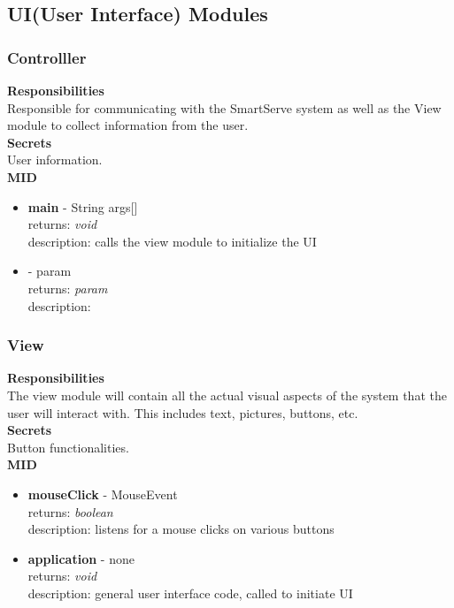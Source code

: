 \documentclass[11pt]{article}
\begin{document}
\subsection{UI(User Interface) Modules}
\subsubsection*{Controlller}
\textbf{Responsibilities} \\
Responsible for communicating with the SmartServe system as well as the View module to collect information from the user. \\
\textbf{Secrets} \\ 
User information. \\ 
\textbf{MID} \\
\begin{itemize}
\item \textbf{main} - String args[] \\ returns: \textit{void} \\ description: calls the view module to initialize the UI
\item \textbf{} - param \\ returns: \textit{param} \\ description:
\end{itemize}
\subsubsection*{View}
\textbf{Responsibilities} \\
The view module will contain all the actual visual aspects of the system that the user will interact with. This includes text, pictures, buttons, etc. \\
\textbf{Secrets} \\ 
Button functionalities. \\ 
\textbf{MID} \\
\begin{itemize}
\item \textbf{mouseClick} - MouseEvent \\ returns: \textit{boolean} \\ description: listens for a mouse clicks on various buttons 
\item \textbf{application} - none \\ returns: \textit{void} \\ description: general user interface code, called to initiate UI
\end{itemize}
\end{document}
